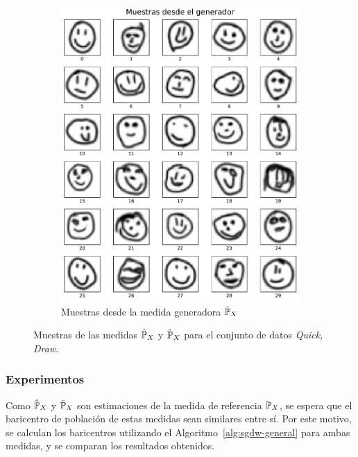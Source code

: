 \begin{figure}[htbp]
\begin{subfigure}[b]{0.45\textwidth}
        \includegraphics[width=\textwidth]{img/distr-sampler/GeneratorDistribSampler-6x5.pdf}
        \caption{Muestras desde la medida generadora $\tilde\Prob_X$}
        \label{fig:sample-gan}
    \end{subfigure}
    \caption{Muestras de las medidas $\hat\Prob_X$ y $\tilde\Prob_X$ para el conjunto de datos \textit{Quick, Draw}.}
    \label{fig:sample}
\end{figure}


\subsubsection{Experimentos}\label{sssec:experimentos-sgdw}  %

Como $\hat \Prob_X$ y $\tilde \Prob_X$ son estimaciones de la medida de referencia $\Prob_X$, se espera que el baricentro de población de estas medidas sean similares entre sí. Por este motivo, se calculan los baricentros utilizando el Algoritmo~\ref{alg:sgdw-general} para ambas medidas, y se comparan los resultados obtenidos.

